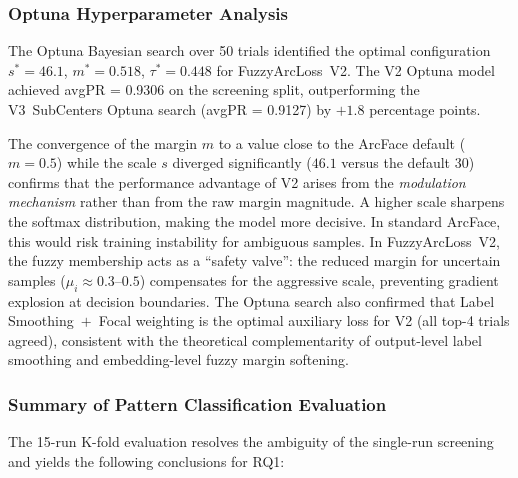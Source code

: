 \subsubsection{Optuna Hyperparameter Analysis}
\label{sec:eval:pattern:optuna}

The Optuna Bayesian search over 50 trials identified the optimal
configuration $s^{*} = 46.1$, $m^{*} = 0.518$, $\tau^{*} = 0.448$
for FuzzyArcLoss~V2.
The V2 Optuna model achieved avgPR = 0.9306 on the screening split,
outperforming the V3~SubCenters Optuna search
(avgPR = 0.9127) by $+1.8$ percentage points.

The convergence of the margin $m$ to a value close to the ArcFace
default ($m = 0.5$) while the scale $s$ diverged significantly
($46.1$ versus the default $30$) confirms that the performance advantage
of V2 arises from the \emph{modulation mechanism} rather than from the
raw margin magnitude.
A higher scale sharpens the softmax distribution, making the model more
decisive.
In standard ArcFace, this would risk training instability for ambiguous
samples.
In FuzzyArcLoss~V2, the fuzzy membership acts as a ``safety valve'': the
reduced margin for uncertain samples ($\mu_{i} \approx 0.3$--$0.5$)
compensates for the aggressive scale, preventing gradient explosion at
decision boundaries.
The Optuna search also confirmed that Label Smoothing~$+$~Focal weighting
is the optimal auxiliary loss for V2 (all top-4 trials agreed), consistent
with the theoretical complementarity of output-level label smoothing and
embedding-level fuzzy margin softening.


\subsubsection{Summary of Pattern Classification Evaluation}
\label{sec:eval:pattern:summary}

The 15-run K-fold evaluation resolves the ambiguity of the single-run
screening and yields the following conclusions for RQ1:

